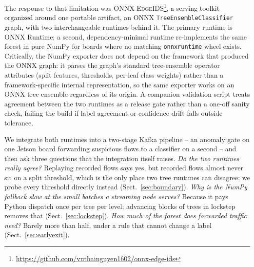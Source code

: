 \documentclass[runningheads]{llncs}
\begin{document}
The response to that limitation was \textsc{ONNX-EdgeIDS}\footnote{\url{https://github.com/vuthainguyen1602/onnx-edge-ids}}, a serving toolkit organized around one portable artifact, an ONNX \texttt{TreeEnsembleClassifier} graph, with two interchangeable runtimes behind it. The primary runtime is ONNX Runtime; a second, dependency-minimal runtime re-implements the same forest in pure NumPy for boards where no matching \texttt{onnxruntime} wheel exists. Critically, the NumPy exporter does not depend on the framework that produced the ONNX graph: it parses the graph's standard tree-ensemble operator attributes (split features, thresholds, per-leaf class weights) rather than a framework-specific internal representation, so the same exporter works on an ONNX tree ensemble regardless of its origin. A companion validation script treats agreement between the two runtimes as a release gate rather than a one-off sanity check, failing the build if label agreement or confidence drift falls outside tolerance.

We integrate both runtimes into a two-stage Kafka pipeline -- an anomaly gate on one Jetson board forwarding suspicious flows to a classifier on a second -- and then ask three questions that the integration itself raises. \emph{Do the two runtimes really agree?} Replaying recorded flows says yes, but recorded flows almost never sit on a split threshold, which is the only place two tree runtimes can disagree; we probe every threshold directly instead (Sect.~\ref{sec:boundary}). \emph{Why is the NumPy fallback slow at the small batches a streaming node serves?} Because it pays Python dispatch once per tree per level; advancing blocks of trees in lockstep removes that (Sect.~\ref{sec:lockstep}). \emph{How much of the forest does forwarded traffic need?} Barely more than half, under a rule that cannot change a label (Sect.~\ref{sec:earlyexit}).
\end{document}
